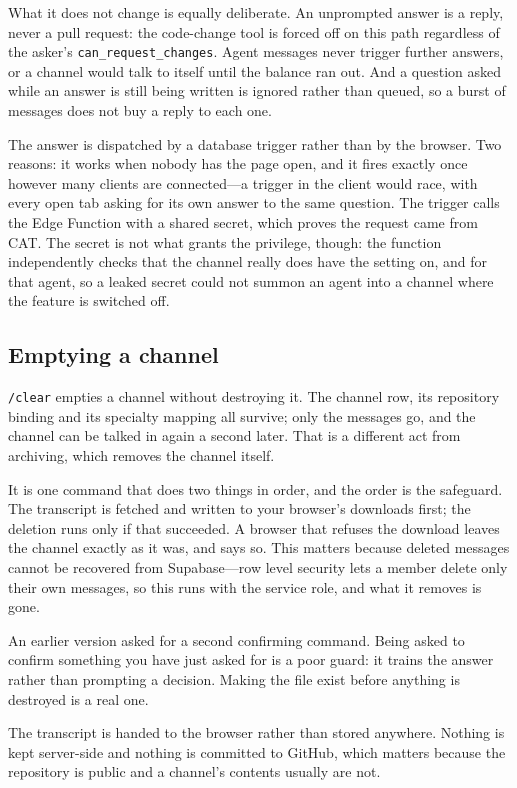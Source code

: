 \documentclass[11pt,letterpaper]{article}
\begin{document}
What it does not change is equally deliberate. An unprompted answer is a
reply, never a pull request: the code-change tool is forced off on this path
regardless of the asker's \texttt{can\_request\_changes}. Agent messages never
trigger further answers, or a channel would talk to itself until the balance
ran out. And a question asked while an answer is still being written is
ignored rather than queued, so a burst of messages does not buy a reply to
each one.

The answer is dispatched by a database trigger rather than by the browser.
Two reasons: it works when nobody has the page open, and it fires exactly
once however many clients are connected---a trigger in the client would race,
with every open tab asking for its own answer to the same question. The
trigger calls the Edge Function with a shared secret, which proves the request
came from CAT. The secret is not what grants the privilege, though: the
function independently checks that the channel really does have the setting
on, and for that agent, so a leaked secret could not summon an agent into a
channel where the feature is switched off.

\subsection{Emptying a channel}
\label{sec:clear}

\texttt{/clear} empties a channel without destroying it. The channel row, its
repository binding and its specialty mapping all survive; only the messages
go, and the channel can be talked in again a second later. That is a different
act from archiving, which removes the channel itself.

It is one command that does two things in order, and the order is the
safeguard. The transcript is fetched and written to your browser's downloads
first; the deletion runs only if that succeeded. A browser that refuses the
download leaves the channel exactly as it was, and says so. This matters
because deleted messages cannot be recovered from Supabase---row level
security lets a member delete only their own messages, so this runs with the
service role, and what it removes is gone.

An earlier version asked for a second confirming command. Being asked to
confirm something you have just asked for is a poor guard: it trains the
answer rather than prompting a decision. Making the file exist before anything
is destroyed is a real one.

The transcript is handed to the browser rather than stored anywhere. Nothing
is kept server-side and nothing is committed to GitHub, which matters because
the repository is public and a channel's contents usually are not.
\end{document}
